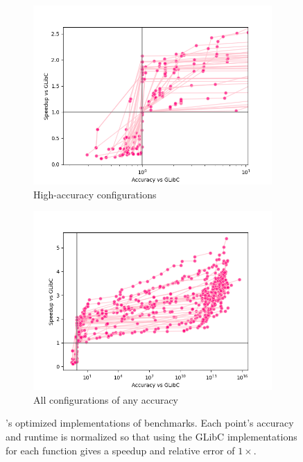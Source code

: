 \documentclass[paper.tex]{subfiles}
\begin{document}
\begin{figure}
  \begin{subfigure}{.5\linewidth}
    \includegraphics[width=\linewidth]{images/zoomed_aggregate.png}
    \caption{High-accuracy configurations}
    \label{fig:aggregatezoom}
  \end{subfigure}%
  \begin{subfigure}{.5\linewidth}
    \includegraphics[width=\linewidth]{images/aggregate.png}
    \caption{All configurations of any accuracy}
    \label{fig:aggregate}
  \end{subfigure}
    \caption{
      \name's optimized implementations of \nBenchmarks benchmarks.
      Each point's accuracy and runtime is normalized
      so that using the GLibC implementations for each function
      gives a speedup and relative error of $1\times$.}
    \label{fig:bothaggregates}
\end{figure}
\end{document}
